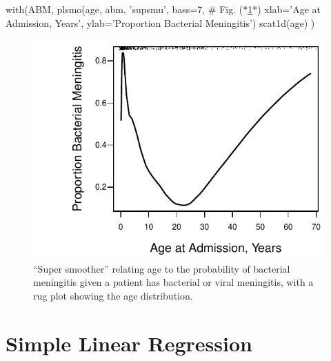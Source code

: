\begin{Schunk}
\begin{Sinput}
with(ABM, {
  plsmo(age, abm, 'supsmu', bass=7,     # Fig. (*\ref{fig:reg-age-abm}*)
        xlab='Age at Admission, Years',
        ylab='Proportion Bacterial Meningitis')
  scat1d(age) })
\end{Sinput}
\begin{figure}[htbp]

\centerline{\includegraphics{reg-age-abm-1} }

\caption[Example of super smoother]{``Super smoother'' relating age to the probability of bacterial meningitis given a patient has bacterial or viral meningitis, with a rug plot showing the age distribution.}\label{fig:reg-age-abm}
\end{figure}
\end{Schunk}
\clearpage

\def\apacue{1}
\section{Simple Linear Regression}%
